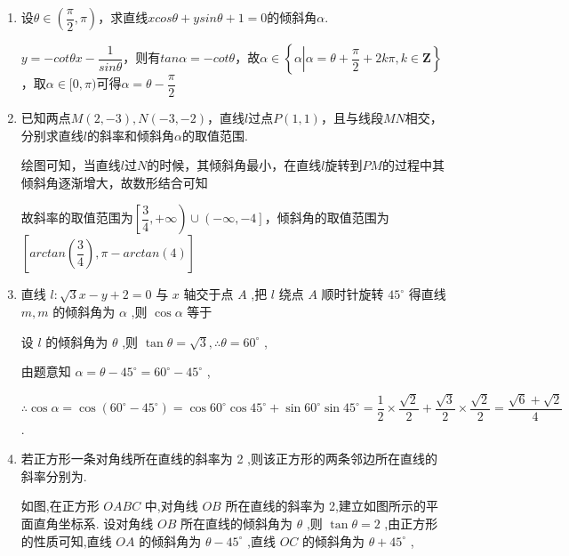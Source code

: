 \begin{enumerate}
    \item 设$\theta \in \left(\dfrac{\pi}{2}, \pi\right)$，求直线$xcos\theta+ysin\theta+1 = 0$的倾斜角$\alpha$.
    \begin{jieda}
        $y = -cot\theta x - \dfrac{1}{sin\theta}$，则有$tan\alpha = -cot\theta$，故$\alpha \in \left\{\alpha \left| \alpha = \theta + \dfrac{\pi}{2} + 2k\pi, k \in \mathbf{Z}\right\}\right.$，取$\alpha \in [0, \pi)$可得$\alpha = \theta - \dfrac{\pi}{2}$
    \end{jieda}
    
    \item 已知两点$M(2, -3), N(-3, -2)$，直线$l$过点$P(1, 1)$，且与线段$MN$相交，分别求直线$l$的斜率和倾斜角$\alpha$的取值范围.
    \begin{jieda}
        绘图可知，当直线$l$过$N$的时候，其倾斜角最小，在直线$l$旋转到$PM$的过程中其倾斜角逐渐增大，故数形结合可知
        故斜率的取值范围为$\left[\dfrac{3}{4}, +\infty \right) \cup \left(-\infty, -4\right]$，倾斜角的取值范围为$\left[arctan\left(\dfrac{3}{4}\right), \pi - arctan\left(4\right) \right]$
    \end{jieda}
    \item 直线 $l : \sqrt{3}x - y + 2 = 0$ 与 $x$ 轴交于点 $A$ ,把 $l$ 绕点 $A$ 顺时针旋转 ${45}^{ \circ  }$ 得直线 $m,m$ 的倾斜角为 $\alpha$ ,则 $\cos \alpha$ 等于
    \begin{jieda}
        设 $l$ 的倾斜角为 $\theta$ ,则 $\tan \theta  = \sqrt{3},\therefore \theta  = {60}^{ \circ  }$ ,

        由题意知 $\alpha  = \theta  - {45}^{ \circ  } = {60}^{ \circ  } - {45}^{ \circ  }$ ,
        
        $\therefore \cos \alpha  = \cos \left( {{60}^{ \circ  } - {45}^{ \circ  }}\right)  = \cos {60}^{ \circ  }\cos {45}^{ \circ  } + \sin {60}^{ \circ  }\sin {45}^{ \circ  } = \dfrac{1}{2} \times  \dfrac{\sqrt{2}}{2} + \dfrac{\sqrt{3}}{2} \times  \dfrac{\sqrt{2}}{2} = \dfrac{\sqrt{6} + \sqrt{2}}{4}$ .
    \end{jieda}
    \item 若正方形一条对角线所在直线的斜率为 2 ,则该正方形的两条邻边所在直线的斜率分别为.
    \begin{jieda}
        如图,在正方形 ${OABC}$ 中,对角线 ${OB}$ 所在直线的斜率为 2,建立如图所示的平面直角坐标系. 设对角线 ${OB}$ 所在直线的倾斜角为 $\theta$ ,则 $\tan \theta  = 2$ ,由正方形的性质可知,直线 ${OA}$ 的倾斜角为 $\theta  - {45}^{ \circ  }$ ,直线 ${OC}$ 的倾斜角为 $\theta  + {45}^{ \circ  }$ ,


\end{jieda}
\end{enumerate}
